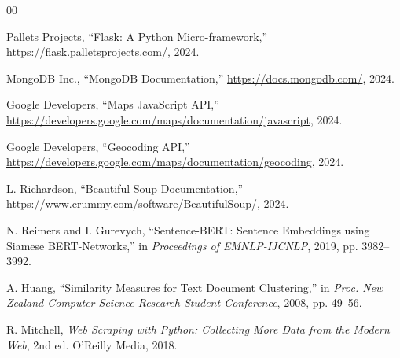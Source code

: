 \documentclass[conference]{IEEEtran}
\begin{document}
\begin{thebibliography}{00}

 Pallets Projects, ``Flask: A Python Micro-framework,'' \url{https://flask.palletsprojects.com/}, 2024.

 MongoDB Inc., ``MongoDB Documentation,'' \url{https://docs.mongodb.com/}, 2024.

 Google Developers, ``Maps JavaScript API,'' \url{https://developers.google.com/maps/documentation/javascript}, 2024.

 Google Developers, ``Geocoding API,'' \url{https://developers.google.com/maps/documentation/geocoding}, 2024.

 L. Richardson, ``Beautiful Soup Documentation,'' \url{https://www.crummy.com/software/BeautifulSoup/}, 2024.

 N. Reimers and I. Gurevych, ``Sentence-BERT: Sentence Embeddings using Siamese BERT-Networks,'' in \textit{Proceedings of EMNLP-IJCNLP}, 2019, pp. 3982–3992.

 A. Huang, ``Similarity Measures for Text Document Clustering,'' in \textit{Proc. New Zealand Computer Science Research Student Conference}, 2008, pp. 49–56.

 R. Mitchell, \textit{Web Scraping with Python: Collecting More Data from the Modern Web}, 2nd ed. O'Reilly Media, 2018.

\end{thebibliography}
\end{document}
